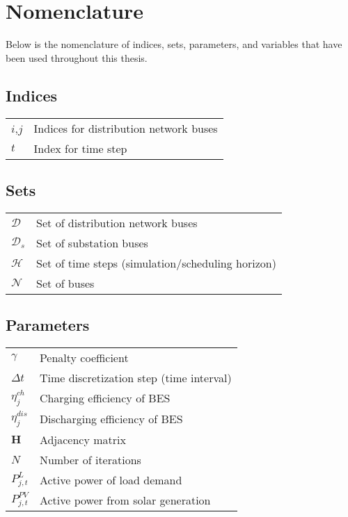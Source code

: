 \thispagestyle{plain}			%


\chapter*{Nomenclature}
Below is the nomenclature of indices, sets, parameters, and variables that have been used throughout this thesis.

\section*{Indices}
\renewcommand*{\arraystretch}{1.35}
\begin{longtable}{p{3cm}p{12cm}}
$i$,$j$ & Indices for distribution network buses\\
$t$ & Index for time step\\
\end{longtable}

\section*{Sets}
\renewcommand*{\arraystretch}{1.35}
\begin{longtable}{p{3cm}p{12cm}}
$\mathcal{D}$ & Set of distribution network buses\\
$\mathcal{D}_{s}$ & Set of substation buses \\
$\mathcal{H}$ & Set of time steps (simulation/scheduling horizon)\\
$\mathcal{N}$ & Set of buses\\
\end{longtable}

\section*{Parameters}
\renewcommand*{\arraystretch}{1.35}
\begin{longtable}{p{3cm}p{12cm}}
$\gamma$& Penalty coefficient\\
$\Delta t$& Time discretization step (time interval)\\
$\eta_{j}^{ch}$& Charging efficiency of BES\\
$\eta_{j}^{dis}$& Discharging efficiency of BES\\
$\boldsymbol{H}$& Adjacency matrix\\
$N$ & Number of iterations\\
$P_{j,t}^{L}$& Active power of load demand\\
$P_{j,t}^{PV}$& Active power from solar generation\\
\end{longtable}

